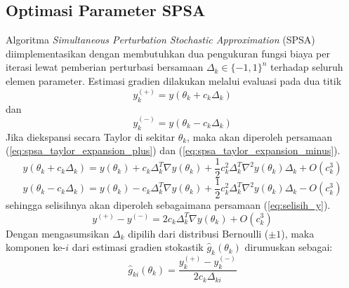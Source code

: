 \subsection{Optimasi Parameter SPSA}

Algoritma \textit{Simultaneous Perturbation Stochastic Approximation} (SPSA) diimplementasikan dengan membutuhkan dua pengukuran fungsi biaya per iterasi lewat pemberian perturbasi bersamaan $\Delta_k \in \{-1, 1\}^n$ terhadap seluruh elemen parameter. Estimasi gradien dilakukan melalui evaluasi pada dua titik 
\begin{equation}
y_k^{(+)} = y(\theta_k + c_k \Delta_k)
\end{equation}
dan
\begin{equation}
y_k^{(-)} = y(\theta_k - c_k \Delta_k)
\end{equation}
Jika diekspansi secara Taylor di sekitar $\theta_k$, maka akan diperoleh persamaan (\ref{eq:spsa_taylor_expansion_plus}) dan (\ref{eq:spsa_taylor_expansion_minus}).
\begin{equation}
y(\theta_k + c_k \Delta_k) = y(\theta_k) + c_k \Delta_k^T \nabla y(\theta_k) + \frac{1}{2} c_k^2 \Delta_k^T \nabla^2 y(\theta_k) \Delta_k + O(c_k^3)
\label{eq:spsa_taylor_expansion_plus}
\end{equation}
\begin{equation}
y(\theta_k - c_k \Delta_k) = y(\theta_k) - c_k \Delta_k^T \nabla y(\theta_k) + \frac{1}{2} c_k^2 \Delta_k^T \nabla^2 y(\theta_k) \Delta_k - O(c_k^3)
\label{eq:spsa_taylor_expansion_minus}
\end{equation}
sehingga selisihnya akan diperoleh sebagaimana persamaan (\ref{eq:selisih_y}).
\begin{equation}
y^{(+)} - y^{(-)} = 2 c_k \Delta_k^T \nabla y(\theta_k) + O(c_k^3)
\label{eq:selisih_y}
\end{equation}
Dengan mengasumsikan $\Delta_k$ dipilih dari distribusi Bernoulli ($\pm 1$), maka komponen ke-$i$ dari estimasi gradien stokastik $\hat{g}_k(\theta_k)$ dirumuskan sebagai:
\begin{equation}
\hat{g}_{ki}(\theta_k) = \frac{y_k^{(+)} - y_k^{(-)}}{2 c_k \Delta_{ki}}
\label{eq:spsa_gradient_component}
\end{equation}

